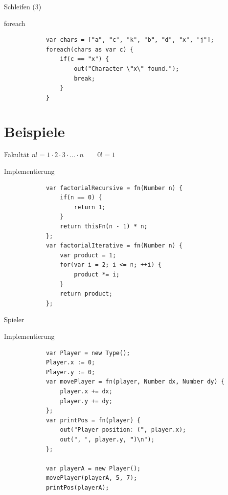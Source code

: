 \documentclass[ucs,9pt]{beamer}
\begin{document}
\begin{frame}[fragile]{Schleifen (3)}
	\begin{block}{foreach}
		\begin{lstlisting}
			var chars = ["a", "c", "k", "b", "d", "x", "j"];
			foreach(chars as var c) {
			    if(c == "x") {
			        out("Character \"x\" found.");
			        break;
			    }
			}
		\end{lstlisting}
	\end{block}
\end{frame}

\section{Beispiele}

\begin{frame}[fragile]{Fakultät}
	$n! = 1 \cdot 2 \cdot 3 \cdot \ldots \cdot n\qquad0! = 1$
	\begin{block}{Implementierung}
		\begin{lstlisting}
			var factorialRecursive = fn(Number n) {
			    if(n == 0) {
			        return 1;
			    }
			    return thisFn(n - 1) * n;
			};
			var factorialIterative = fn(Number n) {
			    var product = 1;
			    for(var i = 2; i <= n; ++i) {
			        product *= i;
			    }
			    return product;
			};
		\end{lstlisting}
	\end{block}
\end{frame}

\begin{frame}[fragile]{Spieler}
	\begin{block}{Implementierung}
		\begin{lstlisting}
			var Player = new Type();
			Player.x := 0;
			Player.y := 0;
			var movePlayer = fn(player, Number dx, Number dy) {
			    player.x += dx;
			    player.y += dy;
			};
			var printPos = fn(player) {
				out("Player position: (", player.x);
				out(", ", player.y, ")\n");
			};

			var playerA = new Player();
			movePlayer(playerA, 5, 7);
			printPos(playerA);
		\end{lstlisting}
	\end{block}
\end{frame}

\HNIlastframe
\end{document}

